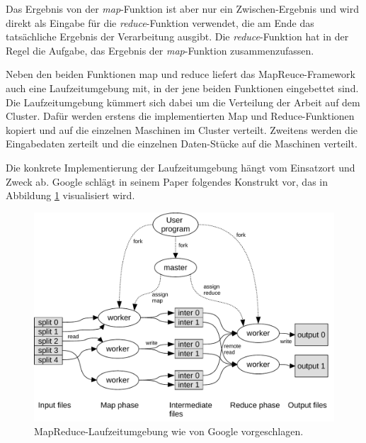 Das Ergebnis von der \textit{map}-Funktion ist aber nur ein Zwischen-Ergebnis und wird direkt als Eingabe für die \textit{reduce}-Funktion verwendet,
die am Ende das tatsächliche Ergebnis der Verarbeitung ausgibt. Die \textit{reduce}-Funktion hat in der Regel die Aufgabe, das Ergebnis der \textit{map}-Funktion
zusammenzufassen.  


Neben den beiden Funktionen map und reduce liefert das MapReuce-Framework auch eine Laufzeitumgebung mit, in der jene beiden Funktionen eingebettet sind.
Die Laufzeitumgebung kümmert sich dabei um die Verteilung der Arbeit auf dem Cluster. 
Dafür werden erstens die implementierten Map und Reduce-Funktionen
kopiert und auf die einzelnen Maschinen im Cluster verteilt. Zweitens werden die Eingabedaten zerteilt und die einzelnen Daten-Stücke auf die Maschinen verteilt. 

Die konkrete Implementierung der Laufzeitumgebung hängt vom Einsatzort und Zweck ab. 
Google schlägt in seinem Paper folgendes Konstrukt vor, das in Abbildung \ref{fig:mapreduce} visualisiert wird.

\begin{figure}
\centering
\includegraphics[width=1.0\textwidth]{images/mapreduce.pdf}
\caption{MapReduce-Laufzeitumgebung wie von Google vorgeschlagen. \cite{miner2012mapreduce}}
\label{fig:mapreduce}
\end{figure}

